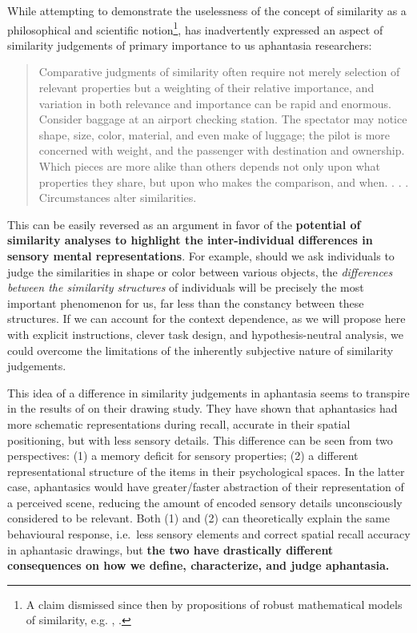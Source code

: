 \documentclass[
  authoryear]{elsarticle}
\begin{document}
While attempting to demonstrate the uselessness of the concept of
similarity as a philosophical and scientific notion\footnote{A claim
  dismissed since then by propositions of robust mathematical models of
  similarity, e.g. \citet{gardenforsConceptualSpacesFramework2004},
  \citet{decockSimilarityGoodman2011}.},
\citet{goodmanSevenStricturesSimilarity1972} has inadvertently expressed
an aspect of similarity judgements of primary importance to us
aphantasia researchers:

\begin{quote}
Comparative judgments of similarity often require not merely selection
of relevant properties but a weighting of their relative importance, and
variation in both relevance and importance can be rapid and enormous.
Consider baggage at an airport checking station. The spectator may
notice shape, size, color, material, and even make of luggage; the pilot
is more concerned with weight, and the passenger with destination and
ownership. Which pieces are more alike than others depends not only upon
what properties they share, but upon who makes the comparison, and when.
. . . Circumstances alter similarities.
\end{quote}

This can be easily reversed as an argument in favor of the
\textbf{potential of similarity analyses to highlight the
inter-individual differences in sensory mental representations}. For
example, should we ask individuals to judge the similarities in shape or
color between various objects, the \emph{differences between the
similarity structures} of individuals will be precisely the most
important phenomenon for us, far less than the constancy between these
structures. If we can account for the context dependence, as we will
propose here with explicit instructions, clever task design, and
hypothesis-neutral analysis, we could overcome the limitations of the
inherently subjective nature of similarity judgements.

This idea of a difference in similarity judgements in aphantasia seems
to transpire in the results of
\citet{bainbridgeQuantifyingAphantasiaDrawing2021} on their drawing
study. They have shown that aphantasics had more schematic
representations during recall, accurate in their spatial positioning,
but with less sensory details. This difference can be seen from two
perspectives: (1) a memory deficit for sensory properties; (2) a
different representational structure of the items in their psychological
spaces. In the latter case, aphantasics would have greater/faster
abstraction of their representation of a perceived scene, reducing the
amount of encoded sensory details unconsciously considered to be
relevant. Both (1) and (2) can theoretically explain the same
behavioural response, i.e.~less sensory elements and correct spatial
recall accuracy in aphantasic drawings, but \textbf{the two have
drastically different consequences on how we define, characterize, and
judge aphantasia.}
\end{document}
